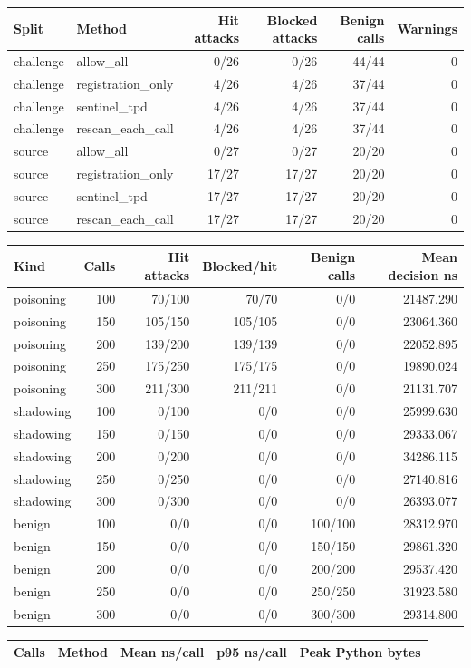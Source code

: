 \begin{tabular}{llrrrr}
Split & Method & Hit attacks & Blocked attacks & Benign calls & Warnings \\
\hline
challenge & allow\_all & 0/26 & 0/26 & 44/44 & 0 \\
challenge & registration\_only & 4/26 & 4/26 & 37/44 & 0 \\
challenge & sentinel\_tpd & 4/26 & 4/26 & 37/44 & 0 \\
challenge & rescan\_each\_call & 4/26 & 4/26 & 37/44 & 0 \\
source & allow\_all & 0/27 & 0/27 & 20/20 & 0 \\
source & registration\_only & 17/27 & 17/27 & 20/20 & 0 \\
source & sentinel\_tpd & 17/27 & 17/27 & 20/20 & 0 \\
source & rescan\_each\_call & 17/27 & 17/27 & 20/20 & 0 \\
\end{tabular}

\begin{tabular}{lrrrrr}
Kind & Calls & Hit attacks & Blocked/hit & Benign calls & Mean decision ns \\
\hline
poisoning & 100 & 70/100 & 70/70 & 0/0 & 21487.290 \\
poisoning & 150 & 105/150 & 105/105 & 0/0 & 23064.360 \\
poisoning & 200 & 139/200 & 139/139 & 0/0 & 22052.895 \\
poisoning & 250 & 175/250 & 175/175 & 0/0 & 19890.024 \\
poisoning & 300 & 211/300 & 211/211 & 0/0 & 21131.707 \\
shadowing & 100 & 0/100 & 0/0 & 0/0 & 25999.630 \\
shadowing & 150 & 0/150 & 0/0 & 0/0 & 29333.067 \\
shadowing & 200 & 0/200 & 0/0 & 0/0 & 34286.115 \\
shadowing & 250 & 0/250 & 0/0 & 0/0 & 27140.816 \\
shadowing & 300 & 0/300 & 0/0 & 0/0 & 26393.077 \\
benign & 100 & 0/0 & 0/0 & 100/100 & 28312.970 \\
benign & 150 & 0/0 & 0/0 & 150/150 & 29861.320 \\
benign & 200 & 0/0 & 0/0 & 200/200 & 29537.420 \\
benign & 250 & 0/0 & 0/0 & 250/250 & 31923.580 \\
benign & 300 & 0/0 & 0/0 & 300/300 & 29314.800 \\
\end{tabular}

\begin{tabular}{llrrr}
Calls & Method & Mean ns/call & p95 ns/call & Peak Python bytes \\
\hline
\end{tabular}
